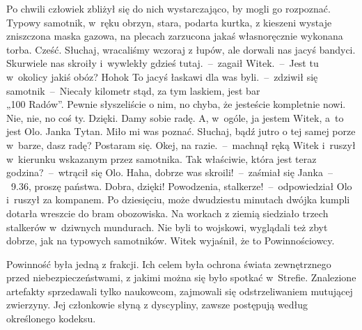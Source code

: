 \documentclass[../MAIN.tex]{subfiles}
\begin{document}
Po chwili człowiek zbliżył się do nich wystarczająco, by mogli go rozpoznać. Typowy samotnik, w~ręku obrzyn, stara, podarta kurtka, z kieszeni wystaje zniszczona maska gazowa, na plecach zarzucona jakaś własnoręcznie wykonana torba.
\sd
\xx Cześć. Słuchaj, wracaliśmy wczoraj z łupów, ale dorwali nas jacyś bandyci.
Skurwiele nas skroiły i~wywlekły gdzieś tutaj.~--~zagaił Witek.~--~Jest tu w~okolicy jakiś obóz?
\xx Hoho\3k To jacyś łaskawi dla was byli.~--~zdziwił się samotnik~--~Niecały kilometr stąd, za tym laskiem, jest bar\\ „100 Radów”. Pewnie słyszeliście o nim, no chyba, że jesteście kompletnie nowi.
\xx Nie, nie, no coś ty. Dzięki. Damy sobie radę. A, w~ogóle, ja jestem Witek, a~to jest Olo.
\xx Janka Tytan. Miło mi was poznać.
\xx Słuchaj, bądź jutro o tej samej porze w~barze, dasz radę?
\xx Postaram się.
\xx Okej, na razie.~--~machnął ręką Witek i~ruszył w~kierunku wskazanym przez samotnika.
\xx Tak właściwie, która jest teraz godzina?~--~wtrącił się Olo.
\xx Haha, dobrze was skroili!~--~zaśmiał się Janka~--~9.36, proszę państwa.
\xx Dobra, dzięki! Powodzenia, stalkerze!~--~odpowiedział Olo i~ruszył za kompanem.
\qm
Po dziesięciu, może dwudziestu minutach dwój\-ka kumpli dotarła wreszcie do bram obozowiska. Na workach z ziemią siedziało trzech stalkerów w~dziwnych mundurach. Nie byli to wojskowi, wyglądali też zbyt dobrze, jak na typowych samotników. Witek wyjaśnił, że to Powinnościowcy.

Powinność była jedną z frakcji. Ich celem była ochrona świata zewnętrznego przed niebezpieczeństwami, z jakimi można się było spotkać w~Strefie. Znalezione artefakty sprzedawali tylko naukowcom, zajmowali się odstrzeliwaniem mutującej zwierzyny. Jej członkowie słyną z dyscypliny, zawsze postępują według określonego kodeksu.
\end{document}
